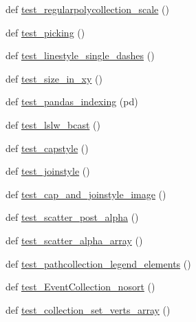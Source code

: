 \begin{DoxyCompactItemize}
\item 
def \hyperlink{namespacematplotlib_1_1tests_1_1test__collections_a56741187b71a810aaad449eb06398d50}{test\+\_\+regularpolycollection\+\_\+scale} ()
\item 
def \hyperlink{namespacematplotlib_1_1tests_1_1test__collections_a6d1a76dc3463277363526c5883e7717f}{test\+\_\+picking} ()
\item 
def \hyperlink{namespacematplotlib_1_1tests_1_1test__collections_ade2a863d14e431eef0c2868f11851345}{test\+\_\+linestyle\+\_\+single\+\_\+dashes} ()
\item 
def \hyperlink{namespacematplotlib_1_1tests_1_1test__collections_af729cc6f7df4a48c464e7d7346b6201a}{test\+\_\+size\+\_\+in\+\_\+xy} ()
\item 
def \hyperlink{namespacematplotlib_1_1tests_1_1test__collections_aa6ada63be51dfa4324302cc965d100fb}{test\+\_\+pandas\+\_\+indexing} (pd)
\item 
def \hyperlink{namespacematplotlib_1_1tests_1_1test__collections_a8d978e18d05f053847ad304b2aca278d}{test\+\_\+lslw\+\_\+bcast} ()
\item 
def \hyperlink{namespacematplotlib_1_1tests_1_1test__collections_ab76efe80d93015ec9b86f8f0aa31e0b9}{test\+\_\+capstyle} ()
\item 
def \hyperlink{namespacematplotlib_1_1tests_1_1test__collections_a38c83debff4b7b25ae863e629af62d21}{test\+\_\+joinstyle} ()
\item 
def \hyperlink{namespacematplotlib_1_1tests_1_1test__collections_ac8b84c878c24f322fe9aa478b2042e17}{test\+\_\+cap\+\_\+and\+\_\+joinstyle\+\_\+image} ()
\item 
def \hyperlink{namespacematplotlib_1_1tests_1_1test__collections_a38d87e8929fbe345d4c92dcfd0e1ecd0}{test\+\_\+scatter\+\_\+post\+\_\+alpha} ()
\item 
def \hyperlink{namespacematplotlib_1_1tests_1_1test__collections_a8acafde72d4dd179b4f97474c50afd08}{test\+\_\+scatter\+\_\+alpha\+\_\+array} ()
\item 
def \hyperlink{namespacematplotlib_1_1tests_1_1test__collections_a24537067e00eec8b7094fd31a7660261}{test\+\_\+pathcollection\+\_\+legend\+\_\+elements} ()
\item 
def \hyperlink{namespacematplotlib_1_1tests_1_1test__collections_a8dad60de67b4c4847a5768d0877103a1}{test\+\_\+\+Event\+Collection\+\_\+nosort} ()
\item 
def \hyperlink{namespacematplotlib_1_1tests_1_1test__collections_adc6dee99a35a20610238eb9f710164ad}{test\+\_\+collection\+\_\+set\+\_\+verts\+\_\+array} ()

\end{DoxyCompactItemize}
